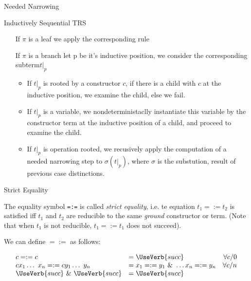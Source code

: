 \documentclass{beamer}
\begin{document}
\begin{section}{Needed Narrowing}
\begin{subsection}{Inductively Sequential TRS}
\begin{frame}
\end{frame}

\begin{frame}
  \begin{itemize}
    \setlength{\itemindent}{2cm}
\item[If $\pi$ is a leaf] we apply the corresponding rule
\item[If $\pi$ is a branch] let p be it's inductive position, we consider the corresponding subterm$t|_p$
  \begin{itemize}
    \item If $t|_p$ is rooted by a constructor $c$, if there is a child  with $c$ at the inductive position, we examine the child, else we fail.

    \item If $t|_p$ is a variable, we nondeterministaclly instantiate this variable by the constructor term at the inductive position of a child, and proceed to examine the child.

    \item If $t|_p$ is operation rooted, we recusively apply the computation of a needed narrowing step to $\sigma(t|_p)$, where $\sigma$ is the substution, result of previous case distinctions.
  \end{itemize}
\end{itemize}

\end{frame}
\end{subsection}
\begin{subsection}{Strict Equality}
\begin{frame}[fragile]
    The equality symbol \verb|=:=| is called \textit{strict equality}, i.e. te equation $t_1 =:= t_2$ is satisfied iff $t_1$ and $t_2$ are reducible to the same \textit{ground} constructor or term. (Note that when $t_1$ is not reducible, $t_1 =:= t_1$ does not succeed).

    We can define $=:=$ as follows:

    \[
    \begin{array}{llr}
    
      c =:= c &= \UseVerb{succ} &\forall  c/0\\
      c x_1 \ldots ~ x_n =:= c y_1 \ldots ~ y_n &= x_1 =:= y_1 ~\&~ \ldots x_n =:= y_n &\forall c/n \\
      \UseVerb{succ}~ \&~ \UseVerb{succ} &= \UseVerb{succ}
    \end{array}
    \]
\end{frame}


\end{subsection}
\end{section}
\end{document}
